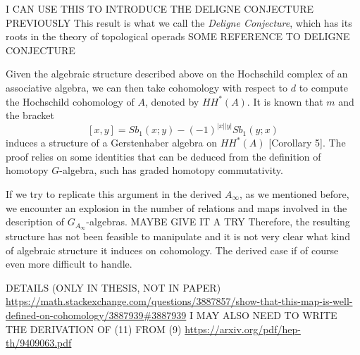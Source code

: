 \documentclass[Thesis.tex]{subfiles}
\begin{document}
I CAN USE THIS TO INTRODUCE THE DELIGNE CONJECTURE PREVIOUSLY
 This result is what we call the \emph{Deligne Conjecture}, which has its roots in the theory of topological operads SOME REFERENCE TO DELIGNE CONJECTURE
 
 
 Given the algebraic structure described above on the Hochschild complex of an associative algebra, we can then take cohomology with respect to $d$ to compute the Hochschild cohomology of $A$, denoted by $HH^*(A)$. It is known that $m$ and the bracket 
\[[x,y]=Sb_1(x; y) -(-1)^{|x||y|}Sb_1(y; x)\]
induces a structure of a Gerstenhaber algebra on $HH^*(A)$ \cite{GV}[Corollary 5]. The proof relies on some identities that can be deduced from the definition of homotopy $G$-algebra, such has graded homotopy commutativity. 

If we try to replicate this argument in the derived $A_\infty$, as we mentioned before, we encounter an explosion in the number of relations and maps involved in the description of $G_{A_\infty}$-algebras. MAYBE GIVE IT A TRY Therefore, the resulting structure has not been feasible to manipulate and it is not very clear what kind of algebraic structure it induces on cohomology. The derived case if of course even more difficult to handle.



DETAILS (ONLY IN THESIS, NOT IN PAPER)
\url{https://math.stackexchange.com/questions/3887857/show-that-this-map-is-well-defined-on-cohomology/3887939#3887939}%
I MAY ALSO NEED TO WRITE THE DERIVATION OF (11) FROM (9)
\url{https://arxiv.org/pdf/hep-th/9409063.pdf}
\end{document}
